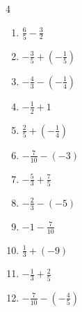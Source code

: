\begin{multicols}{4}
\begin{enumerate}
  \item $\displaystyle \frac{6}{5} - \frac{3}{2}$


  \item $\displaystyle -\frac{3}{5} + \left(-\frac{1}{5}\right)$


\columnbreak %

  \item $\displaystyle -\frac{4}{3} - \left(-\frac{1}{4}\right)$


  \item $\displaystyle -\frac{1}{2} + 1$


  \item $\displaystyle \frac{2}{5} + \left(-\frac{1}{4}\right)$


  \item $\displaystyle -\frac{7}{10} - \left(-3\right)$


  \item $\displaystyle -\frac{5}{3} + \frac{7}{5}$


  \item $\displaystyle -\frac{2}{3} - \left(-5\right)$


  \item $\displaystyle -1 - \frac{7}{10}$


  \item $\displaystyle \frac{1}{3} + \left(-9\right)$


  \item $\displaystyle -\frac{1}{3} + \frac{2}{5}$


  \item $\displaystyle -\frac{7}{10} - \left(-\frac{4}{5}\right)$


\end{enumerate}
\end{multicols}
